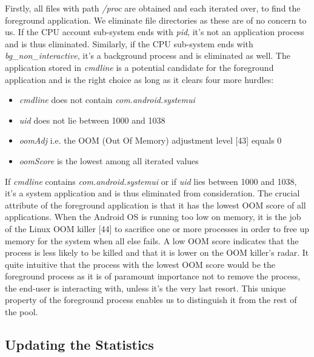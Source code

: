 \documentclass[12pt]{uthesis-v12}  %
\begin{document}
			Firstly, all files with path {\em /proc} are obtained and each iterated over, to find the foreground application. We eliminate file directories as these are of no concern to us. If the CPU account sub-system ends with {\em pid}, it's not an application process and is thus eliminated. Similarly, if the CPU sub-system ends with {\em bg\_non\_interactive}, it's a background process and is eliminated as well. The application stored in {\em cmdline} is a potential candidate for the foreground application and is the right choice as long as it clears four more hurdles:
			
			\begin{itemize}
				\item {\em cmdline} does not contain {\em com.android.systemui}
				\item {\em uid} does not lie between 1000 and 1038
				\item {\em oomAdj} i.e. the OOM (Out Of Memory) adjustment level [43] equals 0
				\item {\em oomScore} is the lowest among all iterated values
			\end{itemize}
			
			If {\em cmdline} contains {\em com.android.systemui} or if {\em uid} lies between 1000 and 1038, it's a system application and is thus eliminated from consideration. The crucial attribute of the foreground application is that it has the lowest OOM score of all applications. When the Android OS is running too low on memory, it is the job of the Linux OOM killer [44] to sacrifice one or more processes in order to free up memory for the system when all else fails. A low OOM score indicates that the process is less likely to be killed and that it is lower on the OOM killer's radar. It quite intuitive that the process with the lowest OOM score would be the foreground process as it is of paramount importance not to remove the process, the end-user is interacting with, unless it's the very last resort. This unique property of the foreground process enables us to distinguish it from the rest of the pool. 
			
		\subsection{Updating the Statistics}
\end{document}
